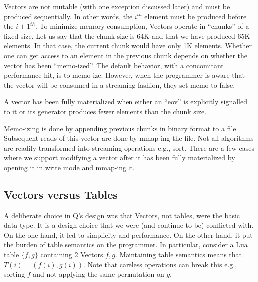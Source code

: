 Vectors are not mutable (with one exception discussed later)
and must be produced sequentially. In other words, the \(i^{th}\) element must
be produced before the \({i+1}^{th}\). To minimize memory consumption, Vectors
operate in ``chunks'' of a fixed size. Let us say that the chunk size is 64K and
that we have produced 65K elements. In that case, the current chunk would have
only 1K elements. Whether one can get access to an element in the previous chunk
depends on whether the vector has been ``memo-ized''. The default behavior, with
a concomitant performance hit, is to memo-ize. However, when the programmer is
aware that the vector will be consumed in a streaming fashion, they set memo
to false.

A vector has been fully materialized when either an ``eov'' is explicitly
signalled to it or its generator produces fewer elements than the chunk size. 

Memo-izing is done by appending previous chunks in binary format to a file.
Subsequent reads of this vector are done by mmap-ing the file. Not all
algorithms are readily transformed into streaming operations e.g., sort. There
are a few cases where we support modifying a vector after it has been fully
materialized by opening it in write mode and mmap-ing it.

\subsection{Vectors versus Tables}
\label{vectors_versus_tables}

A deliberate choice in Q's design was that Vectors, not tables, were the basic
data type. It is a design choice that we were (and continue to be) conflicted with. On the one hand,
it led to simplicity and performance. On the other hand, it put the burden of
table semantics on the programmer. In particular, consider a 
Lua table \(\{f, g\}\) containing 2 Vectors \(f, g\). Maintaining table
semantics means that \(T(i) = (f(i), g(i))\). Note that careless operations
can break this e.g., sorting \(f\) and not applying the same permutation on
\(g\).

